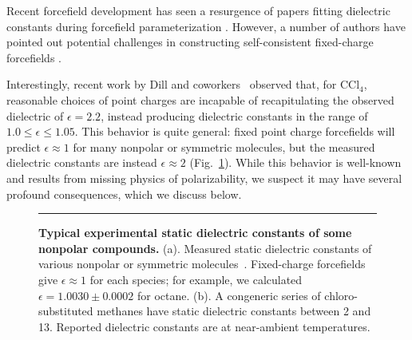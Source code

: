\documentclass[aps,pre,twocolumn,nofootinbib,superscriptaddress,linenumbers]{revtex4-1}
\begin{document}
Recent forcefield development has seen a resurgence of papers fitting dielectric constants during forcefield parameterization \cite{wang2014building, fennell2014fixed}.  
However, a number of authors have pointed out potential challenges in constructing self-consistent fixed-charge forcefields \cite{fennell2012simple, leontyev2014polarizable}.  


Interestingly, recent work by Dill and coworkers~\cite{fennell2012simple} observed that, for $\mathrm{CCl_4}$, reasonable choices of point charges are incapable of recapitulating the observed dielectric of $\epsilon = 2.2$, instead producing dielectric constants in the range of $1.0 \le \epsilon \le 1.05$.  
This behavior is quite general: fixed point charge forcefields will predict $\epsilon \approx 1$ for many nonpolar or symmetric molecules, but the measured dielectric constants are instead $\epsilon \approx 2$ (Fig.~\ref{figure:nonpolars}).  
While this behavior is well-known and results from missing physics of polarizability, we suspect it may have several profound consequences, which we discuss below.



\begin{figure}


\noindent\rule{8cm}{0.4pt}


\caption{{\bf Typical experimental static dielectric constants of some nonpolar compounds.}
(a). Measured static dielectric constants of various nonpolar or symmetric molecules~\cite{d1990dielectric, haynes2011crc}.  
Fixed-charge forcefields give $\epsilon \approx 1$ for each species; for example, we calculated $\epsilon = 1.0030 \pm 0.0002$ for octane.
(b).  A congeneric series of chloro-substituted methanes have static dielectric constants between 2 and 13.  
Reported dielectric constants are at near-ambient temperatures.  
}
\label{figure:nonpolars}

\end{figure}

\end{document}

